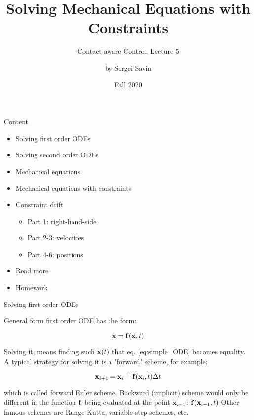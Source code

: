 \documentclass{beamer}
\title{Solving Mechanical Equations with Constraints}
\subtitle{Contact-aware Control, Lecture 5}
\author{by Sergei Savin}
\date{Fall 2020}
\begin{document}
\maketitle


\begin{frame}{Content}

\begin{itemize}
\item Solving first order ODEs
\item Solving second order ODEs
\item Mechanical equations
\item Mechanical equations with constraints
\item Constraint drift
\begin{itemize}
\item Part 1: right-hand-side
\item Part 2-3: velocities
\item Part 4-6: positions
\end{itemize}
\item Read more
\item Homework
\end{itemize}

\end{frame}



\begin{frame}{Solving first order ODEs}
\begin{flushleft}

General form first order ODE has the form:

\begin{equation}
\label{eq:simple_ODE}
\dot{\mathbf{x}} = \mathbf{f}(\mathbf{x}, t)
\end{equation}

Solving it, means finding such $\mathbf{x}(t)$ that eq. \eqref{eq:simple_ODE} becomes equality. A typical strategy for solving it is a "forward" scheme, for example:

\begin{equation}
\label{eq:Euler_scheme}
\mathbf{x}_{i+1} = \mathbf{x}_i + \mathbf{f}(\mathbf{x}_i, t) \Delta t
\end{equation}

which is called forward Euler scheme. Backward (implicit) scheme would only be different in the function $\mathbf{f}$ being evaluated at the point $\mathbf{x}_{i+1}$: $\mathbf{f}(\mathbf{x}_{i+1}, t)$ Other famous schemes are Runge-Kutta, variable step schemes, etc.

\end{flushleft}
\end{frame}
\end{document}
